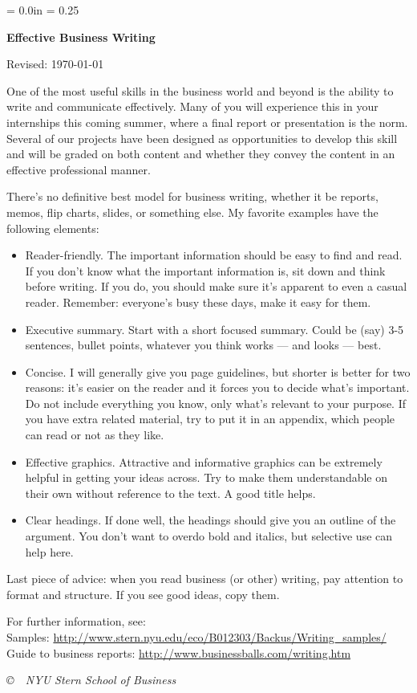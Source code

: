 \documentclass[letterpaper,12pt]{article}
\def\HeadName{Effective Business Writing}
\begin{document}
\parindent = 0.0in
\parskip = 0.25\bigskipamount
\thispagestyle{empty}%
\Head

\centerline{\large \bf \HeadName}%
\centerline{Revised:  \today}

\medskip
One of the most useful skills in the business world and beyond 
is the ability to write and communicate effectively.  
Many of you will experience this in your internships
this coming summer, where a final report or presentation
is the norm.  
Several of our projects have been designed as opportunities to develop
this skill and will be graded on both content
and whether they convey the content in an effective professional manner. 

There's no definitive best model for business writing,
whether it be reports, memos, flip charts, slides, or something else.  
My favorite examples have the following elements:  
%
\begin{itemize}
\item Reader-friendly.  
The important information should be easy to find and read.  
If you don't know what the important information is, 
sit down and think before writing. 
If you do, you should make sure it's apparent to even a casual reader.
Remember:  everyone's busy these days, make it easy for them.  

\item Executive summary.  Start with a short focused summary.  Could be (say) 3-5 sentences, bullet points, whatever you think works 
     --- and looks --- best.  
     
\item Concise.  I will generally give you page guidelines, 
but shorter is better for two reasons:  it's easier on the reader and 
it forces you to decide what's important.  
Do not include everything you know, only what's relevant to your purpose.
If you have extra related material, try to put it in an appendix, 
which people can read or not as they like.  
    
\item Effective graphics.  Attractive and informative graphics 
can be extremely helpful in getting your ideas across.
Try to make them understandable
on their own without reference to the text.  A good title helps.  

\item Clear headings.  If done well, the headings should 
give you an outline of the argument.  
You don't want to overdo bold and italics, 
but selective use can help here.  

\end{itemize}
%
Last piece of advice:  when you read business (or other) writing, 
pay attention to format and structure.  
If you see good ideas, copy them.  

For further information, see:   \\ 
Samples:  \url{http://www.stern.nyu.edu/eco/B012303/Backus/Writing_samples/} \\
Guide to business reports:  \url{http://www.businessballs.com/writing.htm} 


\vfill \centerline{\it \copyright \ \number\year \ 
NYU Stern School of Business}
\end{document}
